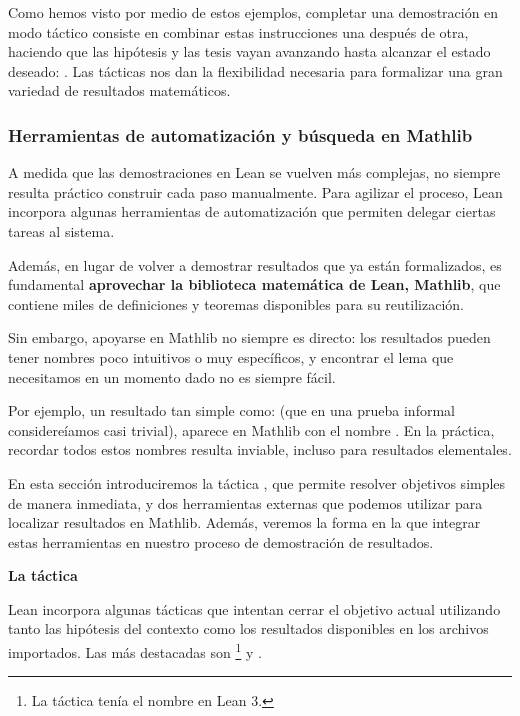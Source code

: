 Como hemos visto por medio de estos ejemplos, completar una demostración en modo táctico consiste en combinar estas instrucciones una después de otra, haciendo que las hipótesis y las tesis vayan avanzando hasta alcanzar el estado deseado: . Las tácticas nos dan la flexibilidad necesaria para formalizar una gran variedad de resultados matemáticos.



\subsubsection{Herramientas de automatización y búsqueda en Mathlib}

A medida que las demostraciones en Lean se vuelven más complejas, no siempre resulta práctico construir cada paso manualmente. Para agilizar el proceso, Lean incorpora algunas herramientas de automatización que permiten delegar ciertas tareas al sistema.

Además, en lugar de volver a demostrar resultados que ya están formalizados, es fundamental \textbf{aprovechar la biblioteca matemática de Lean, Mathlib}, que contiene miles de definiciones y teoremas disponibles para su reutilización.

Sin embargo, apoyarse en Mathlib no siempre es directo: los resultados pueden tener nombres poco intuitivos o muy específicos, y encontrar el lema que necesitamos en un momento dado no es siempre fácil.

Por ejemplo, un resultado tan simple como:  (que en una prueba informal considereíamos casi trivial), aparece en Mathlib con el nombre . En la práctica, recordar todos estos nombres resulta inviable, incluso para resultados elementales.

En esta sección introduciremos la táctica , que permite resolver objetivos simples de manera inmediata, y dos herramientas externas que podemos utilizar para localizar resultados en Mathlib. Además, veremos la forma en la que integrar estas herramientas en nuestro proceso de demostración de resultados.


\vspace{1em}
\noindent\textbf{La táctica }

Lean incorpora algunas tácticas que intentan cerrar el objetivo actual utilizando tanto las hipótesis del contexto como los resultados disponibles en los archivos importados. Las más destacadas son \footnote{La táctica  tenía el nombre  en Lean 3.} y .

